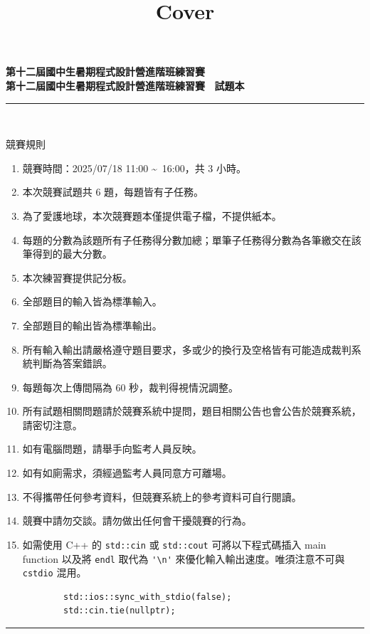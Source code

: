 \documentclass[a4paper]{article}
\title{Cover}
\begin{document}
\begin{center}
\textbf{\huge 第十二屆國中生暑期程式設計營進階班練習賽}\\
\vspace{5mm}
\textbf{\huge 第十二屆國中生暑期程式設計營進階班練習賽 \ 試題本}\\
\vspace{10mm}
\rule{17cm}{2pt}\\
\vspace{5mm}

\huge 競賽規則\\
\end{center}

\fontsize{14pt}{20pt}\selectfont
\begin{enumerate}
    \setlength\itemsep{0.5pt}
    \item 競賽時間：2025/07/18 11:00 \textasciitilde \, 16:00，共 3 小時。
    \item 本次競賽試題共 6 題，每題皆有子任務。
    \item 為了愛護地球，本次競賽題本僅提供電子檔，不提供紙本。
    \item 每題的分數為該題所有子任務得分數加總；單筆子任務得分數為各筆繳交在該筆得到的最大分數。
    \item 本次練習賽提供記分板。
    \item 全部題目的輸入皆為標準輸入。
    \item 全部題目的輸出皆為標準輸出。
    \item 所有輸入輸出請嚴格遵守題目要求，多或少的換行及空格皆有可能造成裁判系統判斷為答案錯誤。
    \item 每題每次上傳間隔為 60 秒，裁判得視情況調整。
    \item 所有試題相關問題請於競賽系統中提問，題目相關公告也會公告於競賽系統，請密切注意。
    \item 如有電腦問題，請舉手向監考人員反映。
    \item 如有如廁需求，須經過監考人員同意方可離場。
    \item 不得攜帶任何參考資料，但競賽系統上的參考資料可自行閱讀。
    \item 競賽中請勿交談。請勿做出任何會干擾競賽的行為。
    \item 如需使用 C++ 的 \lstinline{std::cin} 或 \lstinline{std::cout} 可將以下程式碼插入 main function 以及將 \lstinline{endl} 取代為 \lstinline{'\n'} 來優化輸入輸出速度。唯須注意不可與 \lstinline{cstdio} 混用。
        \begin{lstlisting}
        std::ios::sync_with_stdio(false);
        std::cin.tie(nullptr);
        \end{lstlisting}

\end{enumerate}

\begin{center}
\rule{17cm}{2pt}\\
\end{center}
\end{document}
